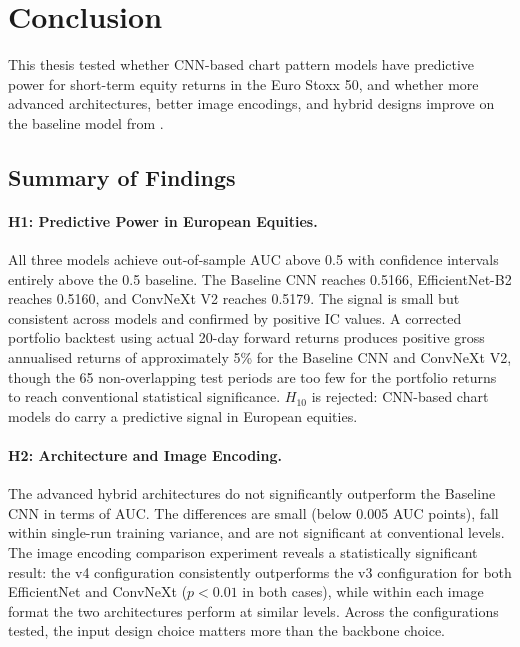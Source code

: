 
\newpage
\section{Conclusion}

This thesis tested whether CNN-based chart pattern models have predictive power for short-term equity returns in the Euro Stoxx 50, and whether more advanced architectures, better image encodings, and hybrid designs improve on the baseline model from \textcite{Jiang2023}.

\subsection{Summary of Findings}

\paragraph{H1: Predictive Power in European Equities.}
All three models achieve out-of-sample AUC above 0.5 with confidence intervals entirely above the 0.5 baseline. The Baseline CNN reaches 0.5166, EfficientNet-B2 reaches 0.5160, and ConvNeXt V2 reaches 0.5179. The signal is small but consistent across models and confirmed by positive IC values. A corrected portfolio backtest using actual 20-day forward returns produces positive gross annualised returns of approximately 5\% for the Baseline CNN and ConvNeXt V2, though the 65 non-overlapping test periods are too few for the portfolio returns to reach conventional statistical significance. $H_{10}$ is rejected: CNN-based chart models do carry a predictive signal in European equities.

\paragraph{H2: Architecture and Image Encoding.}
The advanced hybrid architectures do not significantly outperform the Baseline CNN in terms of AUC. The differences are small (below 0.005 AUC points), fall within single-run training variance, and are not significant at conventional levels. The image encoding comparison experiment reveals a statistically significant result: the v4 configuration consistently outperforms the v3 configuration for both EfficientNet and ConvNeXt ($p < 0.01$ in both cases), while within each image format the two architectures perform at similar levels. Across the configurations tested, the input design choice matters more than the backbone choice.

